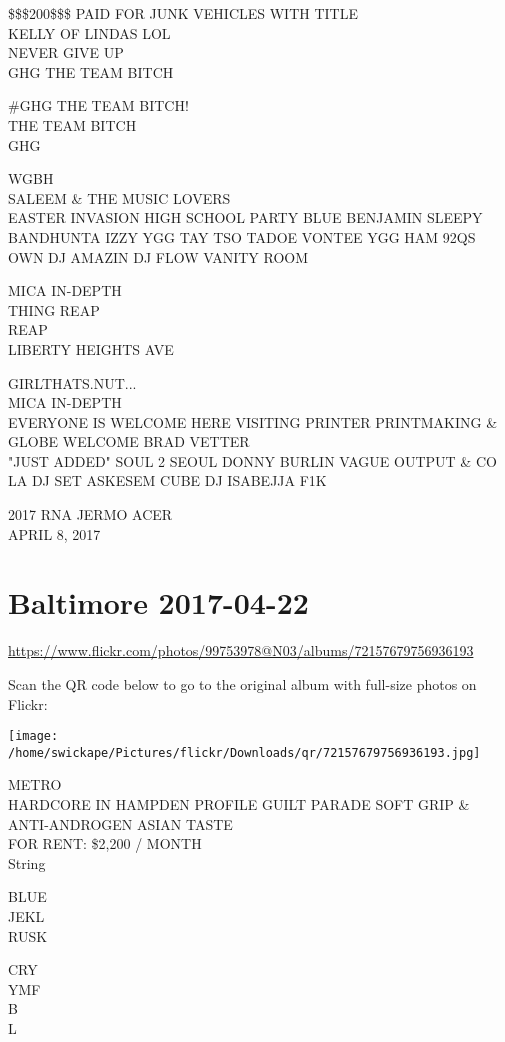 \documentclass[10pt,letterpaper]{article}
\begin{document}
\$\$\$200\$\$\$ PAID FOR JUNK VEHICLES WITH TITLE\\
KELLY OF LINDAS LOL\\
NEVER GIVE UP\\
GHG THE TEAM BITCH

\#GHG THE TEAM BITCH!\\
THE TEAM BITCH\\
GHG

WGBH\\
SALEEM \& THE MUSIC LOVERS\\
EASTER INVASION HIGH SCHOOL PARTY BLUE BENJAMIN SLEEPY BANDHUNTA IZZY YGG TAY TSO TADOE VONTEE YGG HAM 92QS OWN DJ AMAZIN DJ FLOW VANITY ROOM

MICA IN{-}DEPTH\\
THING REAP\\
REAP\\
LIBERTY HEIGHTS AVE

GIRLTHATS.NUT...\\
MICA IN{-}DEPTH\\
EVERYONE IS WELCOME HERE VISITING PRINTER PRINTMAKING \& GLOBE WELCOME BRAD VETTER\\
"JUST ADDED" SOUL 2 SEOUL DONNY BURLIN VAGUE OUTPUT \& CO LA DJ SET ASKESEM CUBE DJ ISABEJJA F1K

2017 RNA JERMO ACER\\
APRIL 8, 2017


\section*{Baltimore 2017-04-22}

\url{https://www.flickr.com/photos/99753978@N03/albums/72157679756936193}

Scan the QR code below to go to the original album with full-size photos on Flickr:

\texttt{[image: /home/swickape/Pictures/flickr/Downloads/qr/72157679756936193.jpg]}


METRO\\
HARDCORE IN HAMPDEN PROFILE GUILT PARADE SOFT GRIP \& ANTI{-}ANDROGEN ASIAN TASTE\\
FOR RENT: \$2,200 / MONTH\\
String

BLUE\\
JEKL\\
RUSK

CRY\\
YMF\\
B\\
L
\end{document}
